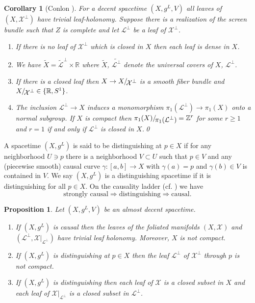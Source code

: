 \documentclass[a4paper,10pt,twoside]{amsart}
\newtheorem{proposition}[theorem]{Proposition}
\newtheorem{corollary}[theorem]{Corollary}
\theoremstyle{definition}
\theoremstyle{remark}
\numberwithin{equation}{section}
\begin{document}
\begin{corollary}[Conlon \cite{MR0370617}]\label{all-leaves-closed}
	For a decent spacetime $(X,g^{L},V)$ all leaves of $(X,\mathcal{X}^{\perp})$ have trivial leaf-holonomy. Suppose there is a realization
	of the screen bundle such that $Z$ is complete and let $\mathcal{L}^{\perp}$ be a leaf of $\mathcal{X}^{\perp}$.
	\begin{enumerate}
		\item
		If there is no leaf of $\mathcal{X}^{\perp}$ which is closed in $X$ then each leaf is dense in $X$.
		\item
		We have $\tilde{X} = \tilde{\mathcal{L}}^{\perp} \times {\mathbb{R}}$ where $\tilde{X}$, $\tilde{\mathcal{L}^{\perp}}$ denote the universal covers
		of $X$, $\mathcal{L}^{\perp}$.
		\item
		If there is a closed leaf then $X \rightarrow {{{X}}/\!\raisebox{-.575ex}{\ensuremath{{\mathcal{X}^{\perp}}}}}$ is a smooth fiber bundle and
		${{{X}}/\!\raisebox{-.575ex}{\ensuremath{{\mathcal{X}^{\perp}}}}} \in \{{\mathbb{R}},S^{1}\}$.
		\item
		The inclusion $\mathcal{L}^{\perp} \rightarrow X$ induces a monomorphism $\pi_{1}(\mathcal{L}^{\perp}) \rightarrow \pi_{1}(X)$ onto
		a normal subgroup. If $X$ is compact then ${{{\pi_{1}(X)}}/\!\raisebox{-.575ex}{\ensuremath{{\pi_{1}(\mathcal{L}^{\perp})}}}}={\mathbb{Z}}^{r}$ for some $r \geq 1$ and
		$r=1$ if and only if $\mathcal{L}^{\perp}$ is closed in $X$.\qed
	\end{enumerate}
\end{corollary}
A spacetime $(X,g^{L})$ is said to be distinguishing at $p \in X$ if for any neighborhood $U \ni p$ there is a neighborhood $V \subset U$ such that
$p \in V$ and any (piecewise smooth) causal curve $\gamma: [a,b] \rightarrow X$ with $\gamma(a)=p$ and $\gamma(b) \in V$ is contained in $V$. We say
$(X,g^{L})$ is a distinguishing spacetime if it is distinguishing for all $p \in X$. On the causality ladder (cf. \cite{MR2436235}) we have
\begin{equation*}
	\text{strongly causal} \Rightarrow \text{distinguishing} \Rightarrow \text{causal}.
\end{equation*}
\begin{proposition}\label{strong-causal-foliation}
	Let $(X,g^{L},V)$ be an almost decent spacetime.
	\begin{enumerate}
		\item
		If $(X,g^{L})$ is causal then the leaves of the foliated manifolds $(X,\mathcal{X})$ and
		$(\mathcal{L}^{\perp},\mathcal{X}|_{\mathcal{L}^{\perp}})$ have trivial leaf holonomy. Moreover, $X$ is not compact.
		\item
		If $(X,g^{L})$ is distinguishing at $p \in X$ then the leaf $\mathcal{L}^{\perp}$ of $\mathcal{X}^{\perp}$ through $p$ is not
		compact.
		\item
		If $(X,g^{L})$ is distinguishing then each leaf of $\mathcal{X}$ is a closed subset in $X$ and each leaf of
		$\mathcal{X}|_{\mathcal{L}^{\perp}}$ is a closed subset in $\mathcal{L}^{\perp}$.
	\end{enumerate}
\end{proposition}
\end{document}
